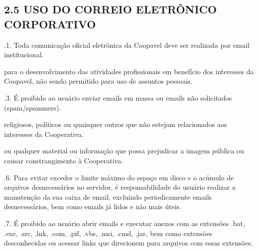 \documentclass[letterpaper,10pt,brazil]{sphinxmanual}
\begin{document}
\subsection{2.5 USO DO CORREIO ELETRÔNICO CORPORATIVO}
\label{\detokenize{regras:id5}}
.1. Toda comunicação oficial eletrônica da Coopavel deve ser realizada por e\sphinxhyphen{}mail institucional.
\begin{description}
\sphinxAtStartPar
para o desenvolvimento das atividades profissionais em benefício dos interesses da Coopavel, não sendo permitido
para uso de assuntos pessoais.

\end{description}

.3. É proibido ao usuário enviar e\sphinxhyphen{}mails em massa ou e\sphinxhyphen{}mails não solicitados (spam/spammers).
\begin{description}
\sphinxAtStartPar
religiosos, políticos ou quaisquer outros que não estejam relacionados aos interesses da Cooperativa.

\sphinxAtStartPar
ou qualquer material ou informação que possa prejudicar a imagem pública ou causar constrangimento à Cooperativa.

\end{description}

.6. Para evitar exceder o limite máximo do espaço em disco e o acúmulo de arquivos desnecessários no servidor, é
responsabilidade do usuário realizar a manutenção da sua caixa de e\sphinxhyphen{}mail, excluindo periodicamente e\sphinxhyphen{}mails
desnecessários, bem como e\sphinxhyphen{}mails já lidos e não mais úteis.

.7. É proibido ao usuário abrir e\sphinxhyphen{}mails e executar anexos com as extensões .bat, .exe, .src, .lnk, .com,
.pif, .vbs, .msi, .cmd, .jar, bem como extensões desconhecidas ou acessar links que direcionem para arquivos
com essas extensões.
\end{document}
